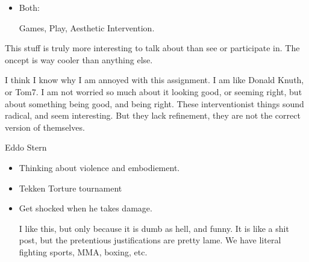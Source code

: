\documentclass{report}
\begin{document}
\begin{description}
\begin{mdframed}
\begin{itemize}
\begin{center}
{                            Its like Primitivism but without the\\
                            commitment.
                        }
                    \end{center}
                \item Both:
                    \begin{mdframed}
                        Games, Play, Aesthetic Intervention.
                    \end{mdframed}
            \end{itemize}
            \begin{mdframed}
                This stuff is truly more interesting to talk
                about than see or participate in. The oncept
                is way cooler than anything else.
            \end{mdframed}
            \begin{mdframed}
                I think I know why I am annoyed with this
                assignment. I am like Donald Knuth, or
                Tom7. I am not worried so much about it
                looking good, or seeming right, but about
                something being good, and being right. These
                interventionist things sound radical, and
                seem interesting. But they lack refinement,
                they are not the correct version of themselves.
            \end{mdframed}
            Eddo Stern
            \begin{itemize}
                \item Thinking about violence and embodiement.
                \item Tekken Torture tournament
                \item Get shocked when he takes damage.
                    \begin{mdframed}
                        I like this, but only because it is
                        dumb as hell, and funny. It is like
                        a shit post, but the pretentious
                        justifications are pretty lame. We have
                        literal fighting sports, MMA, boxing, etc.


\end{mdframed}
\end{itemize}
\end{mdframed}
\end{description}
\end{document}
